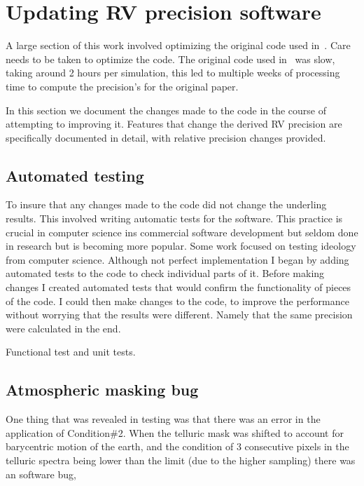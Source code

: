 
\clearpage

\section{Updating RV precision software}
A large section of this work involved optimizing the original code used in~\citet{figueira_radial_2016}.
Care needs to be taken to optimize the code. The original code used in~\citet{figueira_radial_2016} was slow, taking around 2 hours per simulation, this led to multiple weeks of processing time to compute the precision's for the original paper.

In this section we document the changes made to the code in the course of attempting to improving it. Features that change the derived RV precision are specifically documented in detail, with relative precision changes provided.

\subsection{Automated testing}
To insure that any changes made to the code did not change the underling results. This involved writing automatic tests for the software. This practice is crucial in computer science ins commercial software development but seldom done in research but is becoming more popular. 
Some work focused on testing ideology from computer science. Although not perfect implementation I began by adding automated tests to the code to check individual parts of it.
Before making changes I created automated tests that would confirm the functionality of pieces of the code. I could then make changes to the code, to improve the performance without worrying that the results were different.
Namely that the same precision were calculated in the end.

Functional test and unit tests.

\subsection{Atmospheric masking bug}
One thing that was revealed in testing was that there was an error in the application of Condition\#2. When the telluric mask was shifted to account for barycentric motion of the earth, and the condition of 3 consecutive pixels in the telluric spectra being lower than the limit (due to the higher sampling) there was an software bug,


